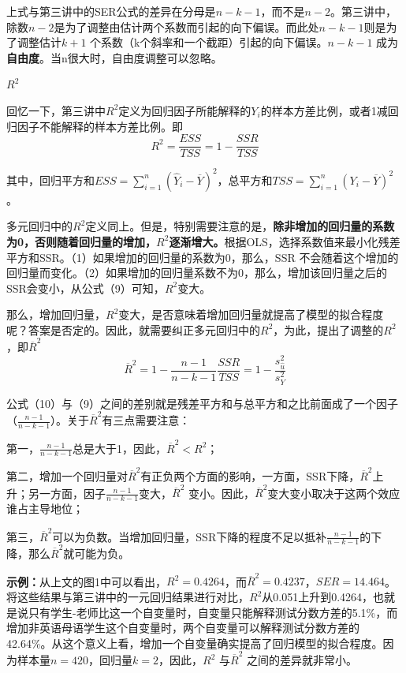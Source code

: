 \documentclass[cn,12pt,math=newtx,citestyle=gb7714-2015,bibstyle=gb7714-2015]{elegantbook}
\begin{document}
	上式与第三讲中的SER公式的差异在分母是$n-k-1$，而不是$n-2$。第三讲中，除数$n-2$是为了调整由估计两个系数而引起的向下偏误。而此处$n-k-1$则是为了调整估计$k+1$ 个系数（k个斜率和一个截距）引起的向下偏误。$n-k-1$ 成为\textbf{自由度}。当n很大时，自由度调整可以忽略。
	
	\textbf{$R^2$}
	
	回忆一下，第三讲中$R^2$定义为回归因子所能解释的$Y_i$的样本方差比例，或者1减回归因子不能解释的样本方差比例。即
	\begin{equation}
		R^2=\frac{ESS}{TSS}=1-\frac{SSR}{TSS}
	\end{equation}
	
	其中，回归平方和$ESS=\sum_{i=1}^n{(\hat{Y}_i-\overline{Y})^2}$，总平方和$TSS=\sum_{i=1}^n{(Y_i-\overline{Y})^2}$。
	
	多元回归中的$R^2$定义同上。但是，特别需要注意的是，\textbf{除非增加的回归量的系数为0，否则随着回归量的增加，$R^2$逐渐增大。}根据OLS，选择系数值来最小化残差平方和SSR。（1）如果增加的回归量的系数为0，那么，SSR 不会随着这个增加的回归量而变化。（2）如果增加的回归量系数不为0，那么，增加该回归量之后的SSR会变小，从公式（9）可知，$R^2$变大。
	
	那么，增加回归量，$R^2$变大，是否意味着增加回归量就提高了模型的拟合程度呢？答案是否定的。因此，就需要纠正多元回归中的$R^2$，为此，提出了调整的$R^2$，即$\overline{R}^2$
	\begin{equation}
		\overline{R}^2=1-\frac{n-1}{n-k-1}\frac{SSR}{TSS}=1-\frac{s_{\hat{u}}^2}{s_Y^2}
	\end{equation}
	
	公式（10）与（9）之间的差别就是残差平方和与总平方和之比前面成了一个因子（$\frac{n-1}{n-k-1}$）。关于$\overline{R}^2$有三点需要注意：
	
	第一，$\frac{n-1}{n-k-1}$总是大于1，因此，$\overline{R}^2<R^2$；
	
	第二，增加一个回归量对$\overline{R}^2$有正负两个方面的影响，一方面，SSR下降，$\overline{R}^2$上升；另一方面，因子$\frac{n-1}{n-k-1}$变大，$\overline{R}^2$ 变小。因此，$\overline{R}^2$变大变小取决于这两个效应谁占主导地位；
	
	第三，$\overline{R}^2$可以为负数。当增加回归量，SSR下降的程度不足以抵补$\frac{n-1}{n-k-1}$的下降，那么$\overline{R}^2$就可能为负。
	
	\textbf{示例：}从上文的图1中可以看出，$R^2=0.4264$，而$\overline{R}^2=0.4237$，$SER=14.464$。将这些结果与第三讲中的一元回归结果进行对比，$R^2$从0.051上升到0.4264，也就是说只有学生-老师比这一个自变量时，自变量只能解释测试分数方差的5.1\%，而增加非英语母语学生这个自变量时，两个自变量可以解释测试分数方差的42.64\%。从这个意义上看，增加一个自变量确实提高了回归模型的拟合程度。因为样本量$n=420$，回归量$k=2$，因此，$R^2$ 与$\overline{R}^2$ 之间的差异就非常小。
	
\end{document}
